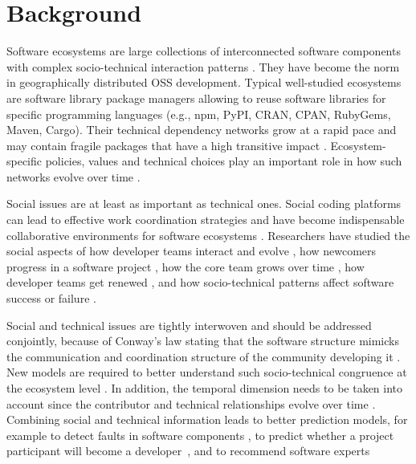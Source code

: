 

\section{Background}

Software ecosystems are large collections of interconnected software components with complex socio-technical interaction patterns \cite{Lungu2009,ManikasHansen2013}. They have become the norm in geographically distributed OSS  development. Typical well-studied ecosystems are software library package managers \cite{Decan2017SANER,Kikas2017,Dietrich2019} allowing to reuse software libraries for specific programming languages (e.g., npm, PyPI, CRAN, CPAN, RubyGems, Maven, Cargo). Their technical dependency networks grow at a rapid pace and may contain fragile packages that have a high transitive impact \cite{Decan2019EMSE}. Ecosystem-specific policies, values and technical choices play an important role in how such networks evolve over time \cite{Bogart2016}.

Social issues are at least as important as technical ones. Social coding platforms can lead to effective work coordination strategies \cite{DabbishSTH12} and have become indispensable collaborative environments for software ecosystems \cite{Herbsleb1999}.
Researchers have studied the social aspects of how developer teams interact and evolve \cite{lopezfernandez2006:sna}, how newcomers progress in a software project \cite{Zhou2011-ICSE,Zhou2012-ICSE}, how the core team grows over time \cite{Robles2009MSR}, how developer teams get renewed \cite{Constantinou2017SANER}, and how socio-technical patterns affect software success or failure \cite{SurianTLCL13}. 

Social and technical issues are tightly interwoven and should be addressed conjointly, because of Conway's law stating that the software structure mimicks the communication and coordination structure of the community developing it \cite{Conway1968, Herbsleb1999, Kwan2011,Blincoe2019}. New models are required to better understand such socio-technical congruence at the ecosystem level \cite{Palyart2018TSE}. In addition, the temporal dimension needs to be taken into account since the contributor and technical relationships evolve over time \cite{Cataldo2008}.
Combining social and technical information leads to better prediction models, for example to detect faults in software components \cite{Bird2009,Bhattacharya2012}, to predict whether a project participant will become a developer~\cite{Gharehyazie2013-ICSM}, and to recommend software experts \cite{Kintab:2014:RSE:2735522.2735526}

